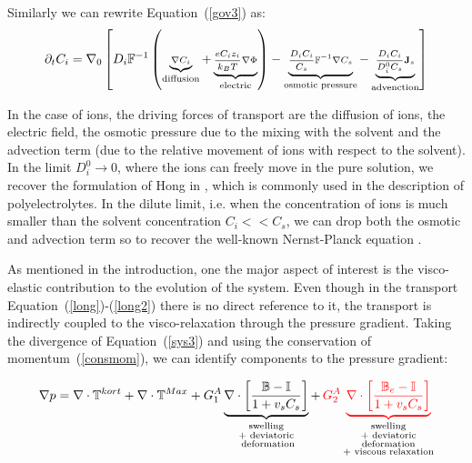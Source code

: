 \documentclass[runningheads]{llncs}
\newcommand{\F}{\ensuremath{\mathbb{F}}}
\newcommand{\B}{\ensuremath{\mathbb{B}}}
\begin{document}
Similarly we can rewrite Equation~(\ref{gov3}) as:
\begin{equation}
\scriptsize
\partial_t C_i = \nabla_0 \left[D_i\F^{-1}\left(\underbrace{\nabla C_i}_{\text{diffusion}} +\underbrace{\frac{eC_iz_i}{k_B T} \nabla \Phi}_{\text{electric}}\right)-\underbrace{\frac{D_i C_i}{C_s}\F^{-1}\nabla C_s}_{\text{osmotic pressure}}-\underbrace{\frac{D_i C_i}{D^0_iC_s}\mathbf{J}_s}_{\text{advenction}}\right]\label{long2}
\end{equation}

In the case of ions, the driving forces of transport are the diffusion of ions, the electric field, the osmotic pressure due to the mixing with the solvent and the advection term (due to the relative movement of ions with respect to the solvent). In the limit $D^0_i\rightarrow0$, where the ions can freely move in the pure solution, we recover the formulation of Hong in \cite{Reviewpolyel}, which is commonly used in the description of polyelectrolytes. In the dilute limit, i.e. when the concentration of ions is much smaller than the solvent  concentration $C_i<<C_s$, we can drop both the osmotic and advection term so to recover the well-known Nernst-Planck equation \cite[see Equation (6.67)]{Reviewpolyel}.

As mentioned in the introduction, one the major aspect of interest is the visco-elastic contribution to the evolution of the system. Even though in the transport Equation~(\ref{long})-(\ref{long2}) there is no direct reference to it, the transport is indirectly coupled to the visco-relaxation through the pressure gradient. Taking the divergence of Equation~(\ref{sys3}) and using the conservation of momentum~(\ref{consmom}), we can identify components to the pressure gradient:

\begin{equation}
\nabla p= \nabla \cdot \mathbb{T}^{kort} + \nabla \cdot \mathbb{T}^{Max} + G_1^A\underbrace{ \nabla \cdot \left[\frac{\B-\mathbb{I}}{1+v_sC_s}\right]}_{\substack{\text{swelling}\\\text{+ deviatoric}\\\text{ deformation}}} + \,\color{red} G_2^A \underbrace{\nabla \cdot\left[\frac{\B_e-\mathbb{I}}{1+v_sC_s}\right]}_{\color{black}\substack{\text{swelling}\\\text{+ deviatoric}\\\text{deformation}\\\text{+ viscous relaxation}}}\color{black}
\end{equation}
\end{document}
